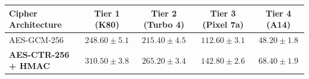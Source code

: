 \documentclass[preview,varwidth=90mm]{standalone}
\begin{document}
\begin{table}[h]
\centering
\footnotesize
\begin{tabular}{lcccc}
\toprule
\textbf{Cipher Architecture} & \textbf{Tier 1 (K80)} & \textbf{Tier 2 (Turbo 4)} & \textbf{Tier 3 (Pixel 7a)} & \textbf{Tier 4 (A14)} \\ \midrule
AES-GCM-256 & $248.60 \pm 5.1$ & $215.40 \pm 4.5$ & $112.60 \pm 3.1$ & $48.20 \pm 1.8$ \\
\textbf{AES-CTR-256 + HMAC} & $\mathbf{310.50 \pm 3.8}$ & $\mathbf{265.20 \pm 3.4}$ & $\mathbf{142.80 \pm 2.6}$ & $\mathbf{68.40 \pm 1.9}$ \\ \bottomrule
\end{tabular}
\end{table}
\end{document}
